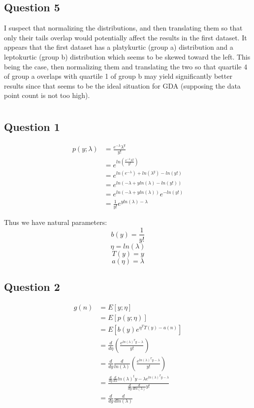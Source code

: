 \documentclass{article}
\begin{document}
\subsection{Question 5}

I suspect that normalizing the distributions, and then translating them so that 
only their tails overlap would potentially affect the results in the first 
dataset. 
It appears that the first dataset has a platykurtic (group a) distribution and
a leptokurtic (group b) distribution which seems to be skewed toward the left.
This being the case, then normalizing them and translating the two so that 
quartile 4 of group a overlaps with quartile 1 of group b may yield significantly
better results since that seems to be the ideal situation for GDA (supposing the
data point count is not too high).

\section{}
\subsection{Question 1}
\begin{center}
	\begin{align*}
		p(y; \lambda) &= \frac{e^{-\lambda}\lambda^y}{y!} \\
					  &= e^{
					  ln(
				  \frac{
			  e^{-\lambda}\lambda^y}{y!}
		  )} \\
		  &=  e ^{
			  ln(
			  e^{-\lambda}
			  )
			  + ln(\lambda^y)
			  - ln(y!)
		  } \\
			&= e^{ln(
				  -\lambda + yln(\lambda) - ln(y!))
			  }\\
			&= e^{
				ln(-\lambda + yln(\lambda))
			} e^{-ln(y!)}\\
			&= \frac{1}{y!}e^{yln(\lambda) - \lambda}
	\end{align*}
\end{center}
Thus we have natural parameters:
\[ b(y) = \frac{1}{y!} \]
\[ \eta = ln(\lambda) \]
\[ T(y) = y \]
\[ a(\eta) = \lambda \]

\subsection{Question 2}
\begin{center}
	\begin{align*}
		g(n) &= E\left[ y; \eta \right ]\\
			 &= E\left[ p(y; \eta) \right] \\
			 &= E\left[ b(y)e^{\eta^TT(y)-a(n)} \right]\\
			 &= \frac{d}{d \eta}\left( \frac{e^{ln(\lambda)^Ty - \lambda}}{y!}\right )\\
			 &= \frac{d}{dy}\frac{d}{ln(\lambda)}\left( \frac{e^{ln(\lambda)^Ty-\lambda}}{y!}\right )\\
			 &= \frac{\frac{d}{dy}\frac{d}{d \lambda}ln(\lambda)^ty -\lambda e^{ln(\lambda)^Ty-\lambda}}
			 {\frac{d}{dy} \frac{d}{d ln(\lambda)}y! }\\
			 &= \frac{d}{dy}\frac{d}{dln(\lambda)}
	 \end{align*}
\end{center}
\end{document}
